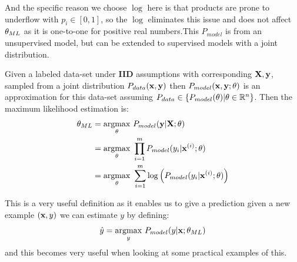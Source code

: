 And the specific reason we choose $\log$ here is that products are prone to underflow with $p_i\in [0,1]$, so the $\log$ eliminates this issue and does not affect $\vtheta_{ML}$ as it is one-to-one for positive real numbers.This $P_{model}$ is from an unsupervised model, but can be extended to supervised models with a joint distribution. \\

\begin{definition}
    Given a labeled data-set under \textbf{IID} assumptions with corresponding $\MX, \vy$, sampled from a joint distribution $P_{data}(\vx,\vy)$ then $P_{model}(\vx,\vy;\vtheta)$ is an approximation for this data-set assuming $P_{data}\in\{P_{model}(\vtheta)|\vtheta \in \R^n \}$. Then the maximum likelihood estimation is:
    \begin{align*}
        \vtheta_{ML} &= \underset{\vtheta}{\argmax}\ P_{model}(\vy|\MX; \vtheta) \\
        & = \underset{\vtheta}{\argmax}\ \prod_{i=1}^m P_{model}(y_i |\vx^{(i)};\vtheta) \\
        & = \underset{\vtheta}{\argmax}\ \sum_{i=1}^m\log\left( P_{model}(y_i |\vx^{(i)};\vtheta) \right)
    \end{align*}
\end{definition}
This is a very useful definition as it enables us to give a prediction given a new example $(\vx, y)$ we can estimate $y$ by defining: 
$$\hat{y} = \underset{y}{\argmax}\ P_{model}(y|\vx;\vtheta_{ML})$$
and this becomes very useful when looking at some practical examples of this. 
